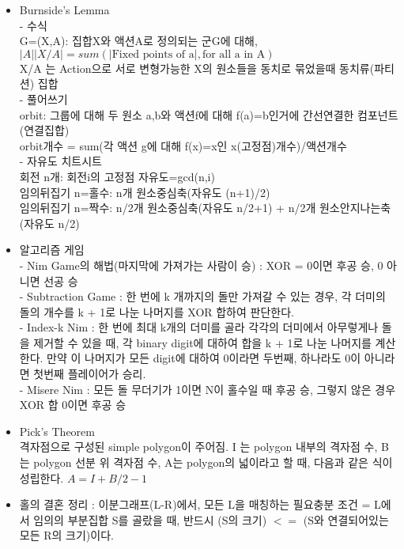 \documentclass[8pt, a4paper, oneside, landscape]{extarticle}
\begin{document}
\begin{multicols*}{2}
\begin{itemize}[noitemsep]
    \item Burnside’s Lemma\\
    - 수식\\
    G=(X,A): 집합X와 액션A로 정의되는 군G에 대해, $\vert A\vert\vert X/A \vert=sum(\vert \text{Fixed points of a}\vert,\text{for all a in A})$\\
    X/A 는 Action으로 서로 변형가능한 X의 원소들을 동치로 묶었을때 동치류(파티션) 집합\\
    - 풀어쓰기\\
    orbit: 그룹에 대해 두 원소 a,b와 액션f에 대해 f(a)=b인거에 간선연결한 컴포넌트(연결집합)\\
    orbit개수 = sum(각 액션 g에 대해 f(x)=x인 x(고정점)개수)/액션개수\\
    - 자유도 치트시트\\
    회전 n개: 회전i의 고정점 자유도=gcd(n,i)\\
    임의뒤집기 n=홀수: n개 원소중심축(자유도 (n+1)/2)\\
    임의뒤집기 n=짝수: n/2개 원소중심축(자유도 n/2+1) + n/2개 원소안지나는축(자유도 n/2)
    
    \item 알고리즘 게임\\
    - Nim Game의 해법(마지막에 가져가는 사람이 승) : XOR = 0이면 후공 승, 0 아니면 선공 승\\
    - Subtraction Game : 한 번에 k 개까지의 돌만 가져갈 수 있는 경우, 각 더미의 돌의 개수를 k + 1로 나눈 나머지를 XOR 합하여 판단한다.\\
    - Index-k Nim : 한 번에 최대 k개의 더미를 골라 각각의 더미에서 아무렇게나 돌을 제거할 수 있을 때, 각 binary digit에 대하여 합을 k + 1로 나눈 나머지를 계산한다. 만약 이 나머지가 모든 digit에 대하여 0이라면 두번째, 하나라도 0이 아니라면 첫번째 플레이어가 승리.\\
    - Misere Nim : 모든 돌 무더기가 1이면 N이 홀수일 때 후공 승, 그렇지 않은 경우 XOR 합 0이면 후공 승
    
    \item Pick’s Theorem\\
    격자점으로 구성된 simple polygon이 주어짐. I 는 polygon 내부의 격자점 수, B 는 polygon 선분 위 격자점 수, A는 polygon의 넓이라고 할 때, 다음과 같은 식이 성립한다. $A=I+B/2-1$
    
    \item 홀의 결혼 정리 : 이분그래프(L-R)에서, 모든 L을 매칭하는 필요충분 조건 = L에서 임의의 부분집합 S를 골랐을 때, 반드시 (S의 크기) $<=$ (S와 연결되어있는 모든 R의 크기)이다.
    

\end{itemize}
\end{multicols*}
\end{document}
